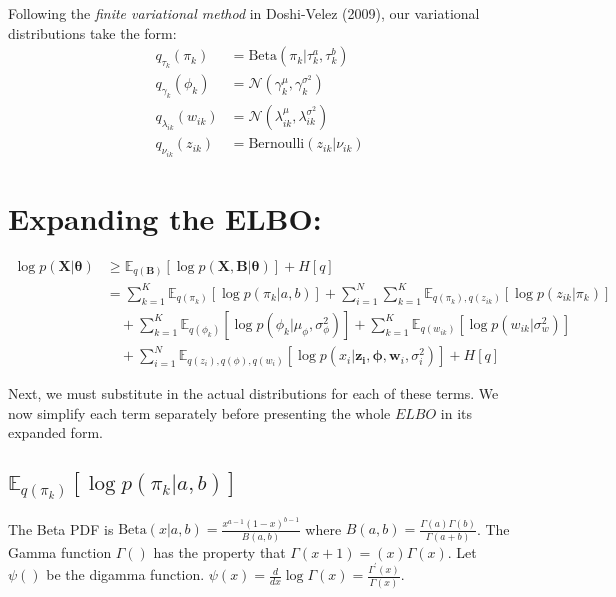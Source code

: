 \documentclass[11pt]{article}
\theoremstyle{definition}
\theoremstyle{plain}
\newcommand{\E}{\mathbb{E}}
\newcommand{\Beta}{\text{Beta}}
\newcommand{\Bernoulli}{\text{Bernoulli}}
\begin{document}
\noindent Following the \textit{finite variational method} in Doshi-Velez (2009), our variational distributions take the form:
\begin{align*}
    q_{\tau_k}(\pi_k) &= \Beta(\pi_k|\tau_k^a, \tau_k^b)\\
    q_{\gamma_k}(\phi_k) &= \mathcal{N}(\gamma_{k}^{\mu}, \gamma_{k}^{\sigma^2})\\
    q_{\lambda_{ik}}(w_{ik}) &= \mathcal{N}(\lambda_{ik}^{\mu}, \lambda_{ik}^{\sigma^2})\\
    q_{\nu_{ik}}(z_{ik}) &= \Bernoulli(z_{ik}|\nu_{ik})
\end{align*}

\section{Expanding the ELBO:}

\begin{align*}
    \log p (\mathbf{X}|\boldsymbol{\theta}) &\geq \E_{q(\mathbf{B})}[\log p(\mathbf{X,B} | \boldsymbol{\theta})] + H[q]\\
                                       &= \sum_{k=1}^K \E_{q(\pi_k)}[\log p(\pi_k|a,b)] 
    + \sum_{i=1}^N \sum_{k=1}^K \E_{q(\pi_k),q(z_{ik})}[\log p(z_{ik}|\pi_k)]\\
    &\quad + \sum_{k=1}^K \E_{q(\phi_k)}[\log p(\phi_k|\mu_{\phi},\sigma^2_\phi)] + \sum_{k=1}^K \E_{q(w_{ik})}[ \log p(w_{ik}|\sigma^2_w)]\\
    &\quad + \sum_{i=1}^N \E_{q(z_i),q(\phi),q(w_i)}[\log p(x_i | \mathbf{z_i}, \boldsymbol{\phi}, \mathbf{w}_i, \sigma^2_i)] + H[q]
\end{align*}

\noindent Next, we must substitute in the actual distributions for each of these terms.
We now simplify each term separately before presenting the whole $ELBO$ in its expanded form.

\subsection{$\E_{q(\pi_k)}[\log p(\pi_k|a,b)]$}

\noindent The Beta PDF is $\Beta(x|a,b) = \frac{x^{a-1}(1-x)^{b-1}}{B(a,b)}$ 
where $B(a,b) = \frac{\Gamma(a)\Gamma(b)}{\Gamma(a+b)}$. The Gamma function $\Gamma()$
has the property that $\Gamma(x+1) =  (x)\Gamma(x)$. Let $\psi()$ be the digamma function.
$\psi(x) = \frac{d}{dx} \log \Gamma(x) = \frac{\Gamma^\prime(x)}{\Gamma(x)}$. 
\end{document}
